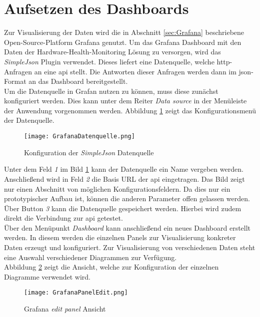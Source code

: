 \newpage
\section{Aufsetzen des Dashboards}\label{sec:AufsetzenDashboard}
Zur Visualisierung der Daten wird die in Abschnitt \ref{sec:Grafana} beschriebene Open-Source-Platform Grafana genutzt. Um das Grafana Dashboard mit den Daten der Hardware-Health-Monitoring Lösung zu versorgen, wird das \textit{SimpleJson} Plugin verwendet. Dieses liefert eine Datenquelle, welche \ac{http}-Anfragen an eine \ac{api} stellt. Die Antworten dieser Anfragen werden dann im \ac{json}-Format an das Dashboard bereitgestellt.\\
Um die Datenquelle in Grafan nutzen zu können, muss diese zunächst konfiguriert werden. Dies kann unter dem Reiter \textit{Data source} in der Menüleiste der Anwendung vorgenommen werden. Abbildung \ref{fig:SimpleJSONKonfig} zeigt das Konfigurationsmenü der Datenquelle. 
\begin{center}
    \begin{figure}[h!]
        \centering
        \texttt{[image: GrafanaDatenquelle.png]}
        \caption{Konfiguration der \textit{SimpleJson} Datenquelle}
        \label{fig:SimpleJSONKonfig}
    \end{figure}
\end{center}
Unter dem Feld \textit{1} im Bild \ref{fig:SimpleJSONKonfig} kann der Datenquelle ein Name vergeben werden. Anschließend wird in Feld \textit{2} die Basis URL der \ac{api} eingetragen. Das Bild zeigt nur einen Abschnitt von möglichen Konfigurationsfeldern. Da dies nur ein prototypischer Aufbau ist, können die anderen Parameter offen gelassen werden. Über Button \textit{3} kann die Datenquelle gespeichert werden. Hierbei wird zudem direkt die Verbindung zur \ac{api} getestet.\\
Über den Menüpunkt \textit{Dashboard} kann anschließend ein neues Dashboard erstellt werden. In diesem werden die einzelnen Panels zur Visualisierung konkreter Daten erzeugt und konfiguriert. Zur Visualisierung von verschiedenen Daten steht eine Auswahl verschiedener Diagrammen zur Verfügung.\\
Abbildung \ref{fig:PanelBearbeitung} zeigt die Ansicht, welche zur Konfiguration der einzelnen Diagramme verwendet wird.
\begin{center}
    \begin{figure}[h!]
        \centering
        \texttt{[image: GrafanaPanelEdit.png]}
        \caption{Grafana \textit{edit panel} Ansicht}
        \label{fig:PanelBearbeitung}
    \end{figure}
\end{center}
